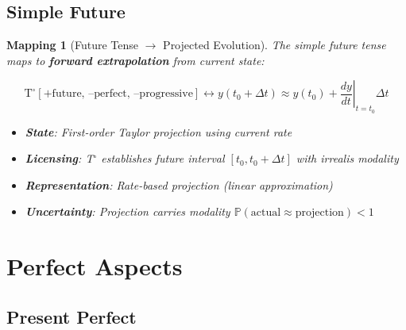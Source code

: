 \documentclass[11pt]{article}
\theoremstyle{defstyle}
\theoremstyle{mapstyle}
\newtheorem{mapping}{Mapping}[section]
\begin{document}
\subsection{Simple Future}

\begin{mapping}[Future Tense $\to$ Projected Evolution]
The simple future tense maps to \textbf{forward extrapolation} from current state:

\[
\boxed{\mathrm{T}^\circ[\text{+future, --perfect, --progressive}] \longleftrightarrow y(t_0 + \Delta t) \approx y(t_0) + \left.\frac{dy}{dt}\right|_{t=t_0} \Delta t}
\]

\begin{itemize}
\item \textbf{State}: First-order Taylor projection using current rate
\item \textbf{Licensing}: T$^\circ$ establishes future interval $[t_0, t_0 + \Delta t]$ with irrealis modality
\item \textbf{Representation}: Rate-based projection (linear approximation)
\item \textbf{Uncertainty}: Projection carries modality $\mathbb{P}(\text{actual} \approx \text{projection}) < 1$
\end{itemize}
\end{mapping}

\vspace{2\baselineskip}

\section{Perfect Aspects}

\subsection{Present Perfect}
\end{document}
